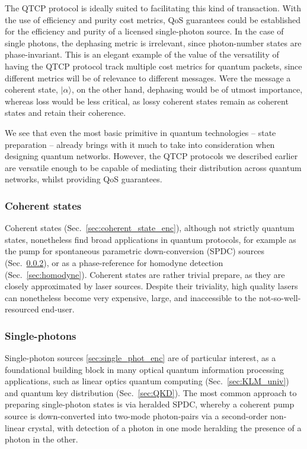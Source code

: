 \documentclass[aps,rmp,twocolumn,amsmath,amssymb,nofootinbib,superscriptaddress,longbibliography,floatfix]{revtex4-1}
\newcommand{\ket}[1]{|#1\rangle}
\begin{document}
The QTCP protocol is ideally suited to facilitating this kind of transaction. With the use of efficiency and purity cost metrics, QoS guarantees could be established for the efficiency and purity of a licensed single-photon source. In the case of single photons, the dephasing metric is irrelevant, since photon-number states are phase-invariant. This is an elegant example of the value of the versatility of having the QTCP protocol track multiple cost metrics for quantum packets, since different metrics will be of relevance to different messages. Were the message a coherent state, $\ket\alpha$, on the other hand, dephasing would be of utmost importance, whereas loss would be less critical, as lossy coherent states remain as coherent states and retain their coherence.

We see that even the most basic primitive in quantum technologies -- state preparation -- already brings with it much to take into consideration when designing quantum networks. However, the QTCP protocols we described earlier are versatile enough to be capable of mediating their distribution across quantum networks, whilst providing QoS guarantees.

%
%

\subsubsection{Coherent states} \label{sec:coherent_states}

Coherent states (Sec.~\ref{sec:coherent_state_enc}), although not strictly quantum states, nonetheless find broad applications in quantum protocols, for example as the pump for spontaneous parametric down-conversion (SPDC) sources (Sec.~\ref{sec:single_phot_src}), or as a phase-reference for homodyne detection (Sec.~\ref{sec:homodyne}). Coherent states are rather trivial prepare, as they are closely approximated by laser sources. Despite their triviality, high quality lasers can nonetheless become very expensive, large, and inaccessible to the not-so-well-resourced end-user.

%
%

\subsubsection{Single-photons} \label{sec:single_phot_src}

Single-photon sources \ref{sec:single_phot_enc} are of particular interest, as a foundational building block in many optical quantum information processing applications, such as linear optics quantum computing (Sec.~\ref{sec:KLM_univ}) and quantum key distribution (Sec.~\ref{sec:QKD}). The most common approach to preparing single-photon states is via heralded SPDC, whereby a coherent pump source is down-converted into two-mode photon-pairs via a second-order non-linear crystal, with detection of a photon in one mode heralding the presence of a photon in the other.
\end{document}
